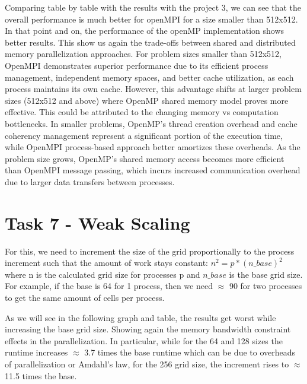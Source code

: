 \documentclass[unicode,11pt,a4paper,oneside,numbers=endperiod,openany]{scrartcl}
\begin{document}
Comparing table by table with the results with the project 3, we can see that the overall 
performance is much better for openMPI for a size smaller than 512x512. In that point and on, the performance
of the openMP implementation shows better results. This show us again the trade-offs between shared and distributed memory parallelization approaches. 
For problem sizes smaller than 512x512, OpenMPI demonstrates superior performance due to its efficient process management, independent memory spaces, and better cache utilization, as each process maintains its own cache. 
However, this advantage shifts at larger problem sizes (512x512 and above) where OpenMP shared memory model proves more effective. 
This could be attributed to the changing memory vs computation bottlenecks. In smaller problems, OpenMP's thread creation overhead and cache coherency management represent a significant portion of the execution time, 
while OpenMPI process-based approach better amortizes these overheads. As the problem size grows, OpenMP's shared memory access becomes more efficient than OpenMPI message passing, which incurs 
increased communication overhead due to larger data transfers between processes. 


\section{Task 7 - Weak Scaling}

For this, we need to increment the size of the grid proportionally to the process increment such that the amount of work stays constant: $n^2 = p * (n\_base)^2$ where n is the 
calculated grid size for processes p and $n\_base$ is the base grid size. For example, 
if the base is 64 for 1 process, then we need $\approx$ 90 for two processes to get the same amount of cells per process. 

As we will see in the following graph and table, the results get worst while increasing the base grid size. Showing again the memory bandwidth 
constraint effects in the parallelization. In particular, while for the 64 and 128 sizes the runtime increases $\approx$ 3.7 times the base runtime 
which can be due to overheads of parallelization or Amdahl's law, for the 256 grid size, the increment rises to $\approx$ 11.5 times the base. 
\end{document}
